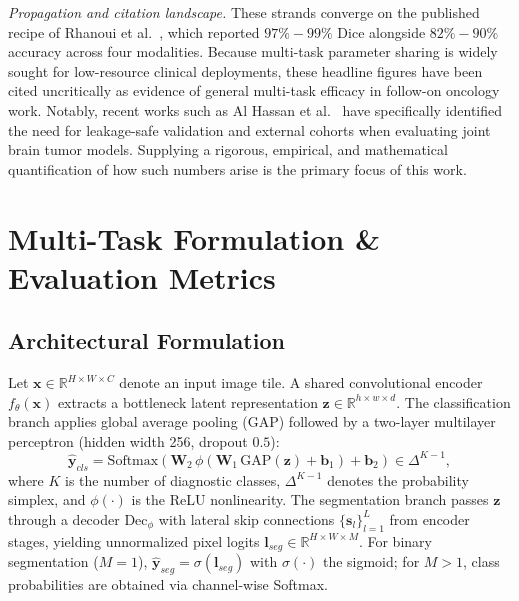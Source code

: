 \documentclass[preprint,12pt]{elsarticle}
\begin{document}
\emph{Propagation and citation landscape.} These strands converge on the published recipe of Rhanoui et al.~\cite{rhanoui2025multitask}, which reported $97\%-99\%$ Dice alongside $82\%-90\%$ accuracy across four modalities. Because multi-task parameter sharing is widely sought for low-resource clinical deployments, these headline figures have been cited uncritically as evidence of general multi-task efficacy in follow-on oncology work. Notably, recent works such as Al Hassan et al.~\cite{imcet2026leakagesafe} have specifically identified the need for leakage-safe validation and external cohorts when evaluating joint brain tumor models. Supplying a rigorous, empirical, and mathematical quantification of how such numbers arise is the primary focus of this work.

\section{Multi-Task Formulation \& Evaluation Metrics}

\subsection{Architectural Formulation}
Let $\mathbf{x} \in \mathbb{R}^{H \times W \times C}$ denote an input image tile. A shared convolutional encoder $f_\theta(\mathbf{x})$ extracts a bottleneck latent representation $\mathbf{z} \in \mathbb{R}^{h \times w \times d}$. The classification branch applies global average pooling (GAP) followed by a two-layer multilayer perceptron (hidden width 256, dropout $0.5$):
\begin{equation}
    \hat{\mathbf{y}}_{cls} = \text{Softmax}\!\left(\mathbf{W}_2\,\phi\!\left(\mathbf{W}_1\,\text{GAP}(\mathbf{z}) + \mathbf{b}_1\right) + \mathbf{b}_2\right) \in \Delta^{K-1},
\end{equation}
where $K$ is the number of diagnostic classes, $\Delta^{K-1}$ denotes the probability simplex, and $\phi(\cdot)$ is the ReLU nonlinearity. The segmentation branch passes $\mathbf{z}$ through a decoder $\text{Dec}_\phi$ with lateral skip connections $\{\mathbf{s}_l\}_{l=1}^L$ from encoder stages, yielding unnormalized pixel logits $\mathbf{l}_{seg} \in \mathbb{R}^{H \times W \times M}$. For binary segmentation ($M=1$), $\hat{\mathbf{y}}_{seg} = \sigma(\mathbf{l}_{seg})$ with $\sigma(\cdot)$ the sigmoid; for $M > 1$, class probabilities are obtained via channel-wise Softmax.
\end{document}
